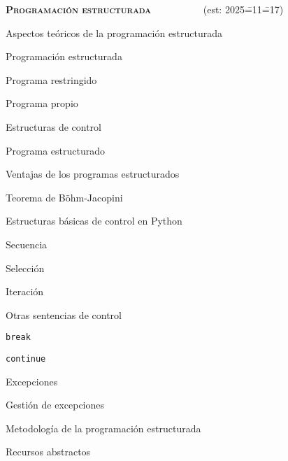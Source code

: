 \begin{longenum}
\begin{longenum}
    \end{longenum}
    \item \textbf{\textsc{Programación estructurada}} \ \ \ \ \ \ \ \ \ \ (est: 2025\==11\==17)
    \begin{longenum}
        \item Aspectos teóricos de la programación estructurada
        \begin{longenum}
            \item Programación estructurada
            \item Programa restringido
            \item Programa propio
            \item Estructuras de control
            \item Programa estructurado
            \begin{longenum}
                \item Ventajas de los programas estructurados
            \end{longenum}
            \item Teorema de Böhm-Jacopini
        \end{longenum}
        \item Estructuras básicas de control en Python
        \begin{longenum}
            \item Secuencia
            \item Selección
            \item Iteración
            \item Otras sentencias de control
            \begin{longenum}
                \item \texttt{break}
                \item \texttt{continue}
                \item Excepciones
                \begin{longenum}
                    \item Gestión de excepciones
                \end{longenum}
            \end{longenum}
        \end{longenum}
        \item Metodología de la programación estructurada
        \begin{longenum}
            \item Recursos abstractos

\end{longenum}
\end{longenum}
\end{longenum}
